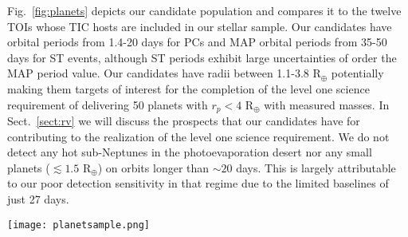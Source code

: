Fig.~\ref{fig:planets} depicts our candidate population and compares it to the twelve TOIs whose TIC hosts are
included in our stellar sample. Our candidates have orbital periods from 1.4-20 days for
PCs and MAP orbital periods from 35-50 days for ST events,
although ST periods exhibit large uncertainties of order the MAP
period value. Our candidates have radii between 1.1-3.8 R$_{\oplus}$ potentially making them targets of interest
for the completion of the \tess{} level one science requirement of delivering 50 planets with $r_p < 4$
R$_{\oplus}$ with measured masses. In Sect.~\ref{sect:rv} we will discuss the prospects that our
candidates have  for contributing to the realization of the \tess{} level one science requirement.
We do not detect any hot sub-Neptunes in the photoevaporation desert
\citep{lundkvist16} nor any small planets ($\lesssim 1.5$ R$_{\oplus}$) on orbits longer than $\sim 20$
days. This is largely attributable to our poor detection sensitivity in that regime due to the limited
\tess{} baselines of just 27 days. \\

\begin{figure*}
  \centering
  \texttt{[image: planetsample.png]}
  \caption{The resulting planet candidates from running \pipeline{} on the 2 minute extracted light curves
    from the first two \tess{} sectors in the period/radius and insolation/radius parameter spaces.
    The legend labels are planet candidates (PC), putative planet candidates (pPC), 
    single transit events (ST), and putative single transit events (pST).
    TOIs which are also detected by \pipeline{} are highlighted with
    orange diamonds surrounding the associated candidate's marker. TOIs which remain undetected by \pipeline{}
    are depicted as small orange diamonds. %
    The outer shaded region in the insolation panel marks the `recent-Venus' and `early-Mars'
    limits of the habitable zone around low mass stars from \cite{kopparapu13}. The inner shaded region
    marks the more conservative `water-loss' and `maximum-greenhouse' habitable zone limits.}
  \label{fig:planets}
\end{figure*}


